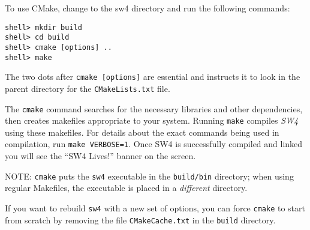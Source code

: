 \documentclass[11pt]{article}
\begin{document}
To use CMake, change to the sw4 directory and run the following commands:
\begin{verbatim}
shell> mkdir build
shell> cd build
shell> cmake [options] ..
shell> make
\end{verbatim}
The two dots after {\tt cmake [options]} are essential and instructs it to look in the parent
directory for the {\tt CMakeLists.txt} file.
 
The \verb+cmake+ command searches for the necessary libraries and other dependencies, then creates
makefiles appropriate to your system.  Running \verb+make+ compiles \emph{SW4} using these
makefiles.  For details about the exact commands being used in compilation, run \texttt{make
  VERBOSE=1}.  Once SW4 is successfully compiled and linked you will see the ``SW4 Lives!'' banner
on the screen.

NOTE: \verb+cmake+ puts the \verb+sw4+ executable in the \verb+build/bin+ directory; when using
regular Makefiles, the executable is placed in a {\em different} directory.

If you want to rebuild \verb+sw4+ with a new set of options, you can force \verb+cmake+ to start
from scratch by removing the file \verb+CMakeCache.txt+ in the \verb+build+ directory.
\end{document}
